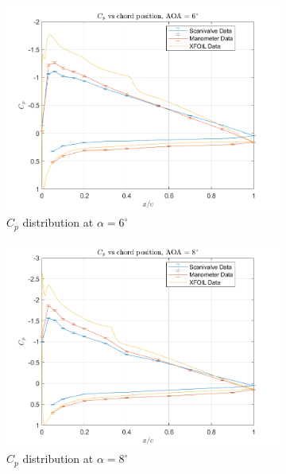 \documentclass[runningheads]{llncs}
\begin{document}
\begin{figure}[h]
\begin{subfigure}[b]{0.3\textwidth}
        \centering
        \includegraphics[width=\textwidth]{figures/AOA6.png}
        \caption{$C_p$ distribution at $\alpha = 6^\circ$}
        \label{fig:cp_6}
    \end{subfigure}
    \begin{subfigure}[b]{0.3\textwidth}
        \centering
        \includegraphics[width=\textwidth]{figures/AOA8.png}
        \caption{$C_p$ distribution at $\alpha = 8^\circ$}
        \label{fig:cp_8}
    \end{subfigure}
    \begin{subfigure}[b]{0.3\textwidth}
        \centering

\end{subfigure}
\end{figure}
\end{document}
